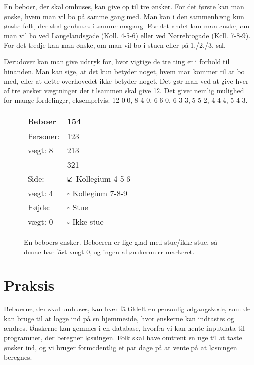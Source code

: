 \documentclass[article,oneside,11pt]{memoir}
\begin{document}
En beboer, der skal omhuses, kan give op til tre ønsker. For det første kan man
ønske, hvem man vil bo på samme gang med. Man kan i den sammenhæng kun ønske
folk, der skal genhuses i samme omgang. For det andet kan man ønske, om man vil
bo ved Langelandsgade (Koll. 4-5-6) eller ved Nørrebrogade (Koll. 7-8-9). For
det tredje kan man ønske, om man vil bo i stuen eller på 1./2./3. sal.

Derudover kan man give udtryk for, hvor vigtige de tre ting er i forhold til
hinanden. Man kan sige, at det kun betyder noget, hvem man kommer til at bo
med, eller at dette overhovedet ikke betyder noget. Det gør man ved at give
hver af tre ønsker vægtninger der tilsammen skal give 12. Det giver nemlig
mulighed for mange fordelinger, eksempelvis: 12-0-0, 8-4-0, 6-6-0, 6-3-3,
5-5-2, 4-4-4, 5-4-3.

\begin{figure}[h]
\begin{center}
\small
\begin{tabular}{ll}
\toprule
Beboer & 154 \\
\midrule
Personer: & 123 \\
vægt: 8 & 213 \\
& 321 \\
\midrule
Side: & $\text{\rlap{$\checkmark$}}\square$ Kollegium 4-5-6 \\
vægt: 4 & $\square$ Kollegium 7-8-9 \\
\midrule
Højde: & $\square$ Stue \\
vægt: 0 & $\square$ Ikke stue \\
\bottomrule
\end{tabular}

\vspace{1em}
\begin{minipage}[t]{0.6\textwidth}
\caption{En beboers ønsker. Beboeren er lige glad med stue/ikke stue, så denne
har fået vægt 0, og ingen af ønskerne er markeret.}
\end{minipage}
\end{center}
\end{figure}

\section{Praksis}

Beboerne, der skal omhuses, kan hver få tildelt en personlig adgangskode, som
de kan bruge til at logge ind på en hjemmeside, hvor ønskerne kan indtastes og
ændres. Ønskerne kan gemmes i en database, hvorfra vi kan hente inputdata til
programmet, der beregner løsningen. Folk skal have omtrent en uge til at taste
ønsker ind, og vi bruger formodentlig et par dage på at vente på at løsningen
beregnes.
\end{document}
